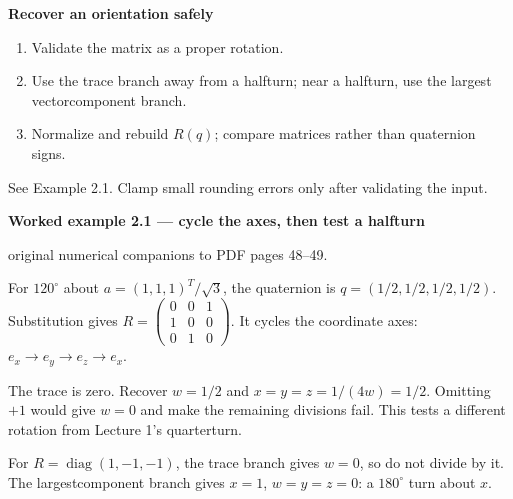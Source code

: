 \documentclass[letterpaper,11pt,english,openany,oneside]{jupyterBook}
\begin{document}
\begin{TextbookBox}
\textbf{Recover an orientation safely}\par\smallskip
\begin{enumerate}
%
\item {}
\sphinxAtStartPar
Validate the matrix as a proper rotation.

\item {}
\sphinxAtStartPar
Use the trace branch away from a half\sphinxhyphen{}turn; near a half\sphinxhyphen{}turn, use the largest vector\sphinxhyphen{}component branch.

\item {}
\sphinxAtStartPar
Normalize and rebuild \(R(q)\); compare matrices rather than quaternion signs.

\end{enumerate}

\sphinxAtStartPar
See Example 2.1. Clamp small rounding errors only after validating the input.

\end{TextbookBox}
\label{\detokenize{lectures/lecture02/quaternions:ex-lec02-conversions}}
\begin{TextbookBox}
\textbf{Worked example 2.1 — cycle the axes, then test a half\sphinxhyphen{}turn}\par\smallskip

\sphinxAtStartPar
{} original numerical companions to PDF pages 48–49.

\sphinxAtStartPar
For \(120^\circ\) about \(a=(1,1,1)^T/\sqrt3\), the quaternion is \(q=(1/2,1/2,1/2,1/2)\). Substitution gives \(R=\begin{pmatrix}0&0&1\\1&0&0\\0&1&0\end{pmatrix}\). It cycles the coordinate axes: \(e_x\to e_y\to e_z\to e_x\).

\sphinxAtStartPar
The trace is zero. Recover \(w=1/2\) and \(x=y=z=1/(4w)=1/2\). Omitting \(+1\) would give \(w=0\) and make the remaining divisions fail. This tests a different rotation from Lecture 1’s quarter\sphinxhyphen{}turn.

\sphinxAtStartPar
For \(R=\operatorname{diag}(1,-1,-1)\), the trace branch gives \(w=0\), so do not divide by it. The largest\sphinxhyphen{}component branch gives \(x=1\), \(w=y=z=0\): a \(180^\circ\) turn about \(x\).

\end{TextbookBox}
\end{document}
